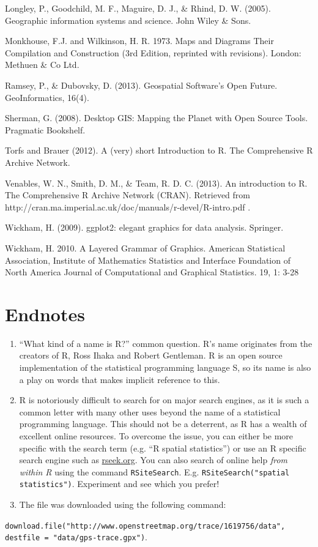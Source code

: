 \documentclass[]{article}
\begin{document}
Longley, P., Goodchild, M. F., Maguire, D. J., \& Rhind, D. W. (2005).
Geographic information systems and science. John Wiley \& Sons.

Monkhouse, F.J. and Wilkinson, H. R. 1973. Maps and Diagrams Their
Compilation and Construction (3rd Edition, reprinted with revisions).
London: Methuen \& Co Ltd.

Ramsey, P., \& Dubovsky, D. (2013). Geospatial Software's Open Future.
GeoInformatics, 16(4).

Sherman, G. (2008). Desktop GIS: Mapping the Planet with Open Source
Tools. Pragmatic Bookshelf.

Torfs and Brauer (2012). A (very) short Introduction to R. The
Comprehensive R Archive Network.

Venables, W. N., Smith, D. M., \& Team, R. D. C. (2013). An introduction
to R. The Comprehensive R Archive Network (CRAN). Retrieved from
http://cran.ma.imperial.ac.uk/doc/manuals/r-devel/R-intro.pdf .

Wickham, H. (2009). ggplot2: elegant graphics for data analysis.
Springer.

Wickham, H. 2010. A Layered Grammar of Graphics. American Statistical
Association, Institute of Mathematics Statistics and Interface
Foundation of North America Journal of Computational and Graphical
Statistics. 19, 1: 3-28

\section{Endnotes}

\begin{enumerate}[1.]
\item
  ``What kind of a name is R?'' common question. R's name originates
  from the creators of R, Ross Ihaka and Robert Gentleman. R is an open
  source implementation of the statistical programming language S, so
  its name is also a play on words that makes implicit reference to
  this.
\item
  R is notoriously difficult to search for on major search engines, as
  it is such a common letter with many other uses beyond the name of a
  statistical programming language. This should not be a deterrent, as R
  has a wealth of excellent online resources. To overcome the issue, you
  can either be more specific with the search term (e.g. ``R spatial
  statistics'') or use an R specific search engine such as
  \href{http://www.rseek.org/}{rseek.org}. You can also search of online
  help \emph{from within R} using the command \texttt{RSiteSearch}. E.g.
  \texttt{RSiteSearch("spatial statistics")}. Experiment and see which
  you prefer!
\item
  The file was downloaded using the following command:
\end{enumerate}
\texttt{download.file("http://www.openstreetmap.org/trace/1619756/data", destfile = "data/gps-trace.gpx")}.
\end{document}

